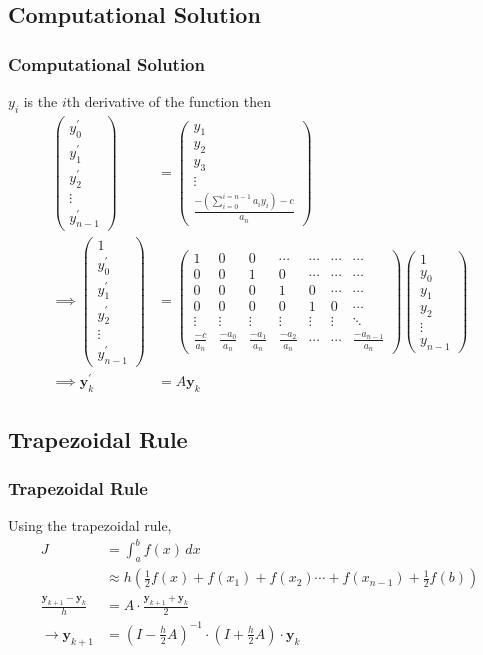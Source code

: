 \documentclass{beamer}
\providecommand{\brak}[1]{\ensuremath{\left(#1\right)}}
\theoremstyle{remark}
\newcommand{\myvec}[1]{\ensuremath{\begin{pmatrix}#1\end{pmatrix}}}
\let\vec\mathbf
\numberwithin{equation}{section}
\begin{document}
\subsection{Computational Solution}
\begin{frame}[fragile]
\frametitle{Computational Solution}
$y_{i}$ is the $i$th derivative of the function then
\begin{align}
    \myvec{y_{0}^{\prime}\\y_{1}^{\prime}\\y_{2}^{\prime}\\ \vdots\\y^{\prime}_{n-1}}&=\myvec{y_{1}\\y_{2}\\y_{3}\\ \vdots\\ \frac{-\brak{\sum_{i=0}^{i=n-1}a_iy_i}-c}{a_n}}\\
    \implies  \myvec{1\\y_{0}^{\prime}\\y_{1}^{\prime}\\y_{2}^{\prime}\\ \vdots\\y^{\prime}_{n-1}}&=\myvec{1&0&0&\cdots&\cdots&\cdots&\cdots\\0&0&1&0&\cdots&\cdots&\cdots\\0&0&0&1&0&\cdots&\cdots\\0&0&0&0&1&0&\cdots\\ \vdots&\vdots&\vdots&\vdots&\vdots&\vdots&\ddots\\ \frac{-c}{a_n}&\frac{-a_{0}}{a_n}&\frac{-a_{1}}{a_n}&\frac{-a_{2}}{a_n}&\cdots&\cdots&\frac{-a_{n-1}}{a_n}}\myvec{1\\y_{0}\\y_{1}\\y_{2}\\ \vdots\\y_{n-1}}\\
    \implies \vec{y}_k^{\prime}&=A\vec{y}_k
\end{align}
\end{frame}
\subsection{Trapezoidal Rule}
\begin{frame}[fragile]
\frametitle{Trapezoidal Rule}
Using the trapezoidal rule,
\begin{align}
    J &= \int_a^b f\brak{x}\, dx\\
    &\approx h\brak{\frac{1}{2}f\brak{x} + f\brak{x_1} + f\brak{x_2} \cdots + f\brak{x_{n-1}} + \frac{1}{2}f\brak{b}}\\
   \frac{\vec{y}_{k+1}-\vec{y}_k}{h}&=A\cdot\frac{\vec{y}_{k+1}+\vec{y}_{k}}{2}\\
    \xrightarrow{} \vec{y}_{k+1}&=\brak{I-\frac{h}{2}A}^{-1}\cdot\brak{I+\frac{h}{2}A}\cdot\vec{y}_k
\end{align}
\end{frame}
\end{document}
